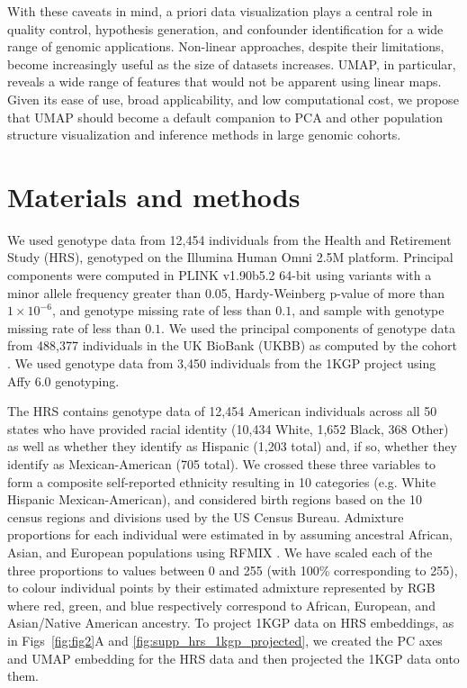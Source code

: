 With these caveats in mind, a priori data visualization plays a central role in quality control, hypothesis generation, and confounder identification for a wide range of genomic applications. Non-linear approaches, despite their limitations, become increasingly useful as the size of datasets increases. UMAP, in particular, reveals a wide range of features that would not be apparent using linear maps. Given its ease of use, broad applicability, and low computational cost, we propose that UMAP should become a default companion to PCA and other population structure visualization and inference methods in large genomic cohorts.

\section{Materials and methods}
We used genotype data from 12,454 individuals from the Health and Retirement Study (HRS), genotyped on the Illumina Human Omni 2.5M platform\citep{juster1995overview}. Principal components were computed in PLINK v1.90b5.2 64-bit\citep{purcell2007plink} using variants with a minor allele frequency greater than 0.05, Hardy-Weinberg p-value of more than $1\times 10^{-6}$, and genotype missing rate of less than $0.1$, and sample with genotype missing rate of less than $0.1$. We used the principal components of genotype data from 488,377 individuals in the UK BioBank (UKBB) as computed by the cohort \citep{sudlow2015uk}. We used genotype data from 3,450 individuals from the 1KGP project using Affy 6.0 genotyping\citep{10002015global}.

The HRS contains genotype data of 12,454 American individuals across all 50 states who have provided racial identity (10,434 White, 1,652 Black, 368 Other) as well as whether they identify as Hispanic (1,203 total) and, if so, whether they identify as Mexican-American (705 total)\citep{juster1995overview}. We crossed these three variables to form a composite self-reported ethnicity resulting in 10 categories (e.g. White Hispanic Mexican-American), and considered birth regions based on the 10 census regions and divisions used by the US Census Bureau. Admixture proportions for each individual were estimated in \citep{baharian2016great} by assuming ancestral African, Asian, and European populations using RFMIX \citep{Maples:2013fia}. We have scaled each of the three proportions to values between 0 and 255 (with 100\% corresponding to 255), to colour individual points by their estimated admixture represented by RGB where red, green, and blue respectively correspond to African, European, and Asian/Native American ancestry. To project 1KGP data on HRS embeddings, as in Figs~\ref{fig:fig2}A and \ref{fig:supp_hrs_1kgp_projected}, we created the PC axes and UMAP embedding for the HRS data and then projected the 1KGP data onto them.

